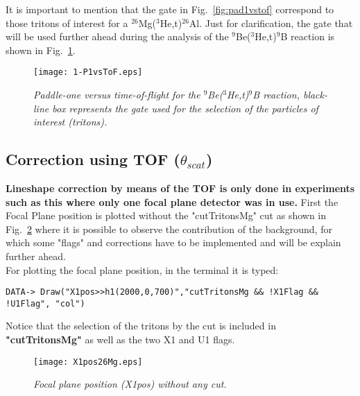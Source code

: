 \documentclass[11pt]{report}
\begin{document}
\noindent It is important to mention that the gate in Fig.~\ref{fig:pad1vstof} correspond 
to those tritons of interest for a
$^{26}$Mg($^{3}$He,t)$^{26}$Al. Just for clarification, the gate that will be used further 
ahead during the analysis 
of the $^{9}$Be($^{3}$He,t)$^{9}$B reaction is shown in Fig.~\ref{fig:1-P1vsToF}.

\begin{figure}[h]
 \begin{center}
\texttt{[image: 1-P1vsToF.eps]}  
 \end{center}
\vspace*{-4mm}
\caption{\label{fig:1-P1vsToF} \it Paddle-one versus time-of-flight for the $^{9}$Be($^{3}$He,t)$^{9}$B reaction, black-line box represents the gate
used for the selection of the particles of interest (tritons).}
\end{figure}
\vspace*{4mm}


\subsection{Correction using TOF ($\theta_{scat}$)}

{\bf Lineshape correction by means of the TOF is only done in experiments such as this
where only one focal plane detector was in use.}
First the Focal Plane position is plotted without the "cutTritonsMg" cut as shown 
in Fig.~\ref{fig:X1pos26Mg} where it is possible to observe the 
contribution of the background, for which some "flags" and corrections have to be 
implemented and will be explain further ahead.\\

For plotting the focal plane position, in the terminal it is typed:
\begin{verbatim}
DATA-> Draw("X1pos>>h1(2000,0,700)","cutTritonsMg && !X1Flag && !U1Flag", "col")
\end{verbatim}

\noindent 
Notice that the selection of the tritons by the cut is included in 
\textbf{"cutTritonsMg"} as well as the two X1 and U1 flags.

\begin{figure}[h]
 \begin{center}
\texttt{[image: X1pos26Mg.eps]}  
 \end{center}
\vspace*{-4mm}
\caption{\label{fig:X1pos26Mg} \it Focal plane position (X1pos) without any cut.}
\end{figure}
\vspace*{4mm}
\end{document}
